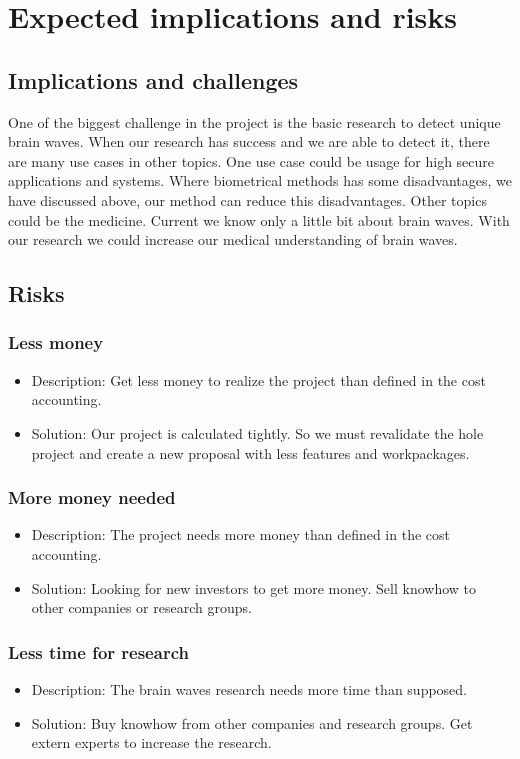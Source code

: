 \section{Expected implications and risks}
\label{sect:implication-risk}

\subsection*{Implications and challenges}
One of the biggest challenge in the project is the basic research to detect unique brain waves. When our research has success and we are able to detect it, there are many use cases in other topics. One use case could be usage for high secure applications and systems. Where biometrical methods has some disadvantages, we have discussed above, our method can reduce this disadvantages.
Other topics could be the medicine. Current we know only a little bit about brain waves. With our research we could increase our medical understanding of brain waves.

\subsection*{Risks}

\subsubsection*{Less money}
\begin{itemize}
 \item Description: Get less money to realize the project than defined in the cost accounting.
 \item Solution: Our project is calculated tightly. So we must revalidate the hole project and create a new proposal with less features and workpackages.
\end{itemize}

\subsubsection*{More money needed}
\begin{itemize}
 \item Description: The project needs more money than defined in the cost accounting.
 \item Solution: Looking for new investors to get more money. Sell knowhow to other companies or research groups.
\end{itemize}

\subsubsection*{Less time for research}
\begin{itemize}
 \item Description: The brain waves research needs more time than supposed.
 \item Solution: Buy knowhow from other companies and research groups. Get extern experts to increase the research.
\end{itemize}


